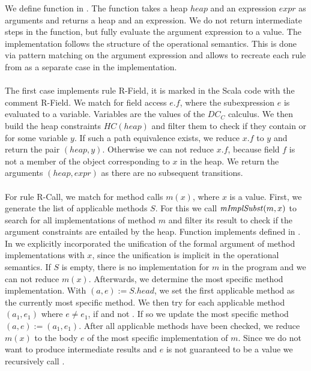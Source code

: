 %
\newpage
We define function  in .
The function takes a heap $heap$ and an expression $expr$
as arguments and returns a heap and an expression.
We do not return intermediate steps in the function,
but fully evaluate the argument expression to a value.
The implementation follows the structure of the operational
semantics.
This is done via pattern matching on the argument expression
and allows to recreate each rule from 
as a separate case in the implementation.\\
\\
The first case implements rule R-Field,
it is marked in the Scala code with the comment R-Field.
We match for field access $e.f$, where the subexpression $e$
is evaluated to a variable.
Variables are the values of the $DC_C$ calculus.
We then build the heap constraints $HC(heap)$
and filter them to check if they contain 
or  for some variable $y$.
If such a path equivalence exists, we
reduce $x.f$ to $y$ and return
the pair $(heap, y)$.
Otherwise we can not reduce $x.f$,
because field $f$ is not a member of the object
corresponding to $x$ in the heap.
We return the arguments $(heap, expr)$
as there are no subsequent transitions.\\
\\
For rule R-Call, we match for method calls $m(x)$,
where $x$ is a value.
First, we generate the list of applicable methods $S$.
For this we call $\mathit{mImplSubst}(m, x)$
to search for all implementations of method $m$
and filter its result to check if the
argument constraints are entailed by the heap.
Function  implements 
defined in .
In  we explicitly incorporated the unification
of the formal argument of method implementations with $x$,
since the unification is implicit in the operational semantics.
If $S$ is empty, there is no implementation for $m$ in the program
and we can not reduce $m(x)$.
Afterwards, we determine the most specific method implementation.
With $(a, e) := S.head$, we set the first applicable method
as the currently most specific method.
We then try for each applicable method $(a_1, e_1)$ where $e \not= e_1$,
if  and not .
If so we update the most specific method $(a, e) := (a_1, e_1)$.
After all applicable methods have been checked, we reduce
$m(x)$ to the body $e$ of the most specific implementation of $m$.
Since we do not want to produce intermediate results and $e$
is not guaranteed to be a value we recursively call .
